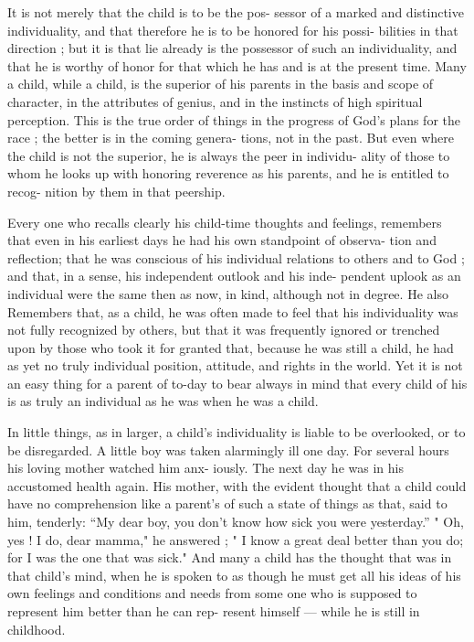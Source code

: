 \documentclass[
]{book}
\begin{document}
It is not merely that the child is to be the pos- sessor of a marked and distinctive individuality, and that therefore he is to be honored for his possi- bilities in that direction ; but it is that lie already is the possessor of such an individuality, and that he is worthy of honor for that which he has and is at the present time. Many a child, while a child, is the superior of his parents in the basis and scope of character, in the attributes of genius, and in the instincts of high spiritual perception. This is the true order of things in the progress of God's plans for the race ; the better is in the coming genera- tions, not in the past. But even where the child is not the superior, he is always the peer in individu- ality of those to whom he looks up with honoring reverence as his parents, and he is entitled to recog- nition by them in that peership.

Every one who recalls clearly his child-time thoughts and feelings, remembers that even in his earliest days he had his own standpoint of observa- tion and reflection; that he was conscious of his individual relations to others and to God ; and that, in a sense, his independent outlook and his inde- pendent uplook as an individual were the same then as now, in kind, although not in degree. He also Remembers that, as a child, he was often made to feel that his individuality was not fully recognized by others, but that it was frequently ignored or trenched upon by those who took it for granted that, because he was still a child, he had as yet no truly individual position, attitude, and rights in the world. Yet it is not an easy thing for a parent of to-day to bear always in mind that every child of his is as truly an individual as he was when he was a child.

In little things, as in larger, a child's individuality is liable to be overlooked, or to be disregarded. A little boy was taken alarmingly ill one day. For several hours his loving mother watched him anx- iously. The next day he was in his accustomed health again. His mother, with the evident thought that a child could have no comprehension like a parent's of such a state of things as that, said to him, tenderly: ``My dear boy, you don't know how sick you were yesterday.'' " Oh, yes ! I do, dear mamma," he answered ; " I know a great deal better than you do; for I was the one that was sick." And many a child has the thought that was in that child's mind, when he is spoken to as though he must get all his ideas of his own feelings and conditions and needs from some one who is supposed to represent him better than he can rep- resent himself --- while he is still in childhood.
\end{document}
